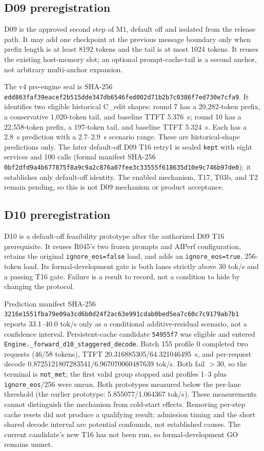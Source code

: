 \documentclass[11pt]{article}
\begin{document}
\subsection{D09 preregistration}

D09 is the approved second step of M1, default off and isolated from the release path. It may add one checkpoint at the previous message boundary only when prefix length is at least 8192 tokens and the tail is at most 1024 tokens. It reuses the existing host-memory slot; an optional prompt-cache-tail is a second anchor, not arbitrary multi-anchor expansion.

The v4 pre-engine seal is SHA-256 \texttt{edd863faf39eacef2b515dde347db6546fed002d71b2b7c0386f7ed730e7cfa9}. It identifies two eligible historical C\_edit shapes: round 7 has a 20,282-token prefix, a conservative 1,020-token tail, and baseline TTFT 5.376~s; round 10 has a 22,558-token prefix, a 197-token tail, and baseline TTFT 5.324~s. Each has a 2.8~s prediction with a 2.7--2.9~s scenario range. These are historical-shape predictions only. The later default-off D09 T16 retry1 is sealed \texttt{kept} with eight services and 100 calls (formal manifest SHA-256 \texttt{0bf2dfd9a4b677875f8a9c9a2c876a07fee3c33555f618635d10e9c746b97de0}); it establishes only default-off identity. The enabled mechanism, T17, T03b, and T2 remain pending, so this is not D09 mechanism or product acceptance.

\subsection{D10 preregistration}

D10 is a default-off feasibility prototype after the authorized D09 T16 prerequisite. It reuses R045's two frozen prompts and AIPerf configuration, retains the original \texttt{ignore\_eos=false} load, and adds an \texttt{ignore\_eos=true}, 256-token load. Its formal-development gate is both lanes strictly above 30 tok/s and a passing T16 gate. Failure is a result to record, not a condition to hide by changing the protocol.

Prediction manifest SHA-256 \texttt{3216e1551fba79e09a3cd6b0d24f2ac63e991cdab0bed5ea7c60c7c9179ab7b1} reports 33.1--40.0 tok/s only as a conditional additive-residual scenario, not a confidence interval. Persistent-cache candidate \texttt{54955f7} was eligible and entered \texttt{Engine.\_forward\_d10\_staggered\_decode}. Batch 155 profile 0 completed two requests (46/58 tokens), TTFT 20.316885305/64.321046495~s, and per-request decode 0.8725121807283541/6.967070060487639 tok/s. Both fail $>30$, so the terminal is \texttt{not\_met}; the first valid group stopped and profiles 1--3 plus \texttt{ignore\_eos}/256 were unrun. Both prototypes measured below the per-lane threshold (the earlier prototype: 5.855077/1.064367 tok/s). These measurements cannot distinguish the mechanism from cold-start effects. Removing per-step cache resets did not produce a qualifying result; admission timing and the short shared decode interval are potential confounds, not established causes. The current candidate's new T16 has not been run, so formal-development GO remains unmet.
\end{document}
